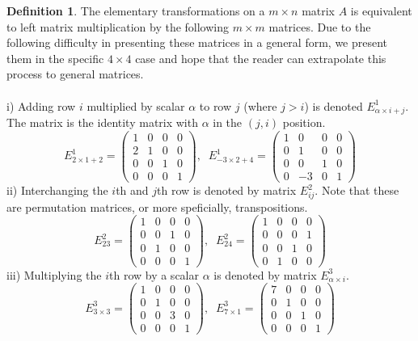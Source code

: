 \documentclass{article}
\theoremstyle{remark}
\theoremstyle{definition}
\newtheorem{definition}{Definition}[section]
\begin{document}
\begin{definition}
The elementary transformations on a $m \times n$ matrix $A$ is equivalent to left matrix multiplication by the following $m \times m$ matrices. Due to the following difficulty in presenting these matrices in a general form, we present them in the specific $4 \times 4$ case and hope that the reader can extrapolate this process to general matrices. \\ \\
i) Adding row $i$ multiplied by scalar $\alpha$ to row $j$ (where $j > i$) is denoted $E^1_{\alpha \times i + j}$. The matrix is the identity matrix with $\alpha$ in the $(j, i)$ position. 
\[E^1_{2 \times 1 + 2} = \begin{pmatrix}
1&0&0&0 \\ 2&1&0&0 \\ 0&0&1&0 \\ 0&0&0&1
\end{pmatrix}, \;\; E^1_{-3 \times 2 + 4} = \begin{pmatrix}
1&0&0&0 \\ 0&1&0&0 \\ 0&0&1&0 \\ 0&-3&0&1
\end{pmatrix}\]
ii) Interchanging the $i$th and $j$th row is denoted by matrix $E^2_{i j}$. Note that these are permutation matrices, or more speficially, transpositions. 
\[ E^2_{2 3} = \begin{pmatrix}
1&0&0&0 \\ 0&0&1&0 \\ 0&1&0&0 \\ 0&0&0&1
\end{pmatrix}, \; \; E^2_{2 4} = \begin{pmatrix}
1&0&0&0 \\ 0&0&0&1 \\ 0&0&1&0 \\ 0&1&0&0
\end{pmatrix}\]
iii) Multiplying the $i$th row by a scalar $\alpha$ is denoted by matrix $E^3_{\alpha \times i}$. 
\[ E^3_{3 \times 3} = \begin{pmatrix}
1&0&0&0 \\ 0&1&0&0 \\ 0&0&3&0 \\ 0&0&0&1
\end{pmatrix}, \;\; E^3_{7 \times 1} = \begin{pmatrix}
7&0&0&0 \\ 0&1&0&0 \\ 0&0&1&0 \\ 0&0&0&1
\end{pmatrix}\]
\end{definition}
\end{document}
